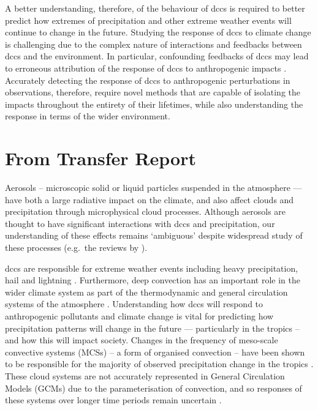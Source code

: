 A better understanding, therefore, of the behaviour of \acrshort{dcc}s is required to better predict how extremes of precipitation and other extreme weather events will continue to change in the future.
Studying the response of \acrshort{dcc}s to climate change is challenging due to the complex nature of interactions and feedbacks between \acrshort{dcc}s and the environment.
In particular, confounding feedbacks of \acrshort{dcc}s may lead to erroneous attribution of the response of \acrshort{dcc}s to anthropogenic impacts \citep{varble_erroneous_2018}.
Accurately detecting the response of \acrshort{dcc}s to anthropogenic perturbations in observations, therefore, require novel methods that are capable of isolating the impacts throughout the entirety of their lifetimes, while also understanding the response in terms of the wider environment.


\section{From Transfer Report}

Aerosols – microscopic solid or liquid particles suspended in the atmosphere --- have both a large radiative  impact on the climate, and also affect clouds and precipitation through microphysical cloud processes. 
Although aerosols are thought to have significant interactions with \acrshort{dcc}s and precipitation, our understanding of these effects remains ‘ambiguous’ \citep{IPCCCloudsAeorosolsBoucher2013} despite widespread study of these processes (e.g.\ the reviews by \citet{levin_aerosol_2008, tao_impact_2012, fan_review_2016}).

\acrshort{dcc}s are responsible for extreme weather events including heavy precipitation, hail and lightning \citep{westra_future_2014}. Furthermore, deep convection has an important role in the wider climate system as part of the thermodynamic and general circulation systems of the atmosphere \citep{weisman_mesoscale_2015}. Understanding how \acrshort{dcc}s will respond to anthropogenic pollutants and climate change is vital for predicting how precipitation patterns will change in the future --- particularly in the tropics – and how this will impact society. 
Changes in the frequency of meso-scale convective systems (MCSs) – a form of organised convection – have been shown to be responsible for the majority of observed precipitation change in the tropics \citep{tan_increases_2015}. 
These cloud systems are not accurately represented in General Circulation Models (GCMs) due to the parameterisation of convection, and so responses of these systems over longer time periods remain uncertain \citep{ogorman_precipitation_2015}.

